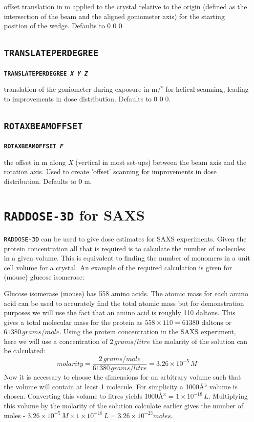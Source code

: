 \documentclass[a4paper]{article}
\newcommand{\RD}{\texttt{RADDOSE-3D}\xspace}
\newcommand{\Keyword}[1]{\texttt{\textbf{#1}}\xspace}
\begin{document}
offset translation in \hbox{\textmu}m applied to the crystal relative to the origin (defined as the intersection of the beam and the aligned goniometer axis) for the starting position of the wedge. Defaults to 0 0 0.



\subsection{\Keyword{TRANSLATEPERDEGREE}}

\noindent \Keyword{TRANSLATEPERDEGREE \textit{X Y Z}}

translation of the goniometer during exposure in \hbox{\textmu}m$/^{\circ}$ for helical scanning, leading to improvements in dose distribution. Defaults to 0 0 0.



\subsection{\Keyword{ROTAXBEAMOFFSET}}

\noindent \Keyword{ROTAXBEAMOFFSET \textit{F}}

the offset in \hbox{\textmu}m along \textit{X} (vertical in most set-ups) between the beam axis and the rotation axis. Used to create 'offset' scanning for improvements in dose distribution. Defaults to 0 \hbox{\textmu}m.

\newpage

\section{\RD for SAXS}

\RD can be used to give dose estimates for SAXS experiments. Given the protein concentration all that is required is to calculate the number of molecules in a given volume. This is equivalent to finding the number of monomers in a unit cell volume for a crystal. An example of the required calculation is given for (mouse) glucose isomerase:

Glucose isomerase (mouse) has 558 amino acids. The atomic mass for each amino acid can be used to accurately find the total atomic mass but for demonstration purposes we will use the fact that an amino acid is roughly 110 daltons. This gives a total molecular mass for the protein as $558 \times 110 = 61380$ daltons or $61380\,grams/mole$. Using the protein concentration in the SAXS experiment, here we will use a concentration of $2\,grams/litre$ the molarity of the solution can be calculated: 
\begin{equation}
molarity = \frac{2\,grams/mole}{61380\,grams/litre} = 3.26 \times 10^{-5}\,M
\end{equation} 
Now it is necessary to choose the dimensions for an arbitrary volume such that the volume will contain at least 1 molecule.
For simplicity a 1000\AA$^3$ volume is chosen. Converting this volume to litres yields 1000\AA$^3$ = $1 \times 10^{-18}\,L$. Multiplying this volume by the molarity of the solution calculate earlier gives the number of moles - $3.26 \times 10^{-5}\,M \times 1 \times 10^{-18}\,L = 3.26 \times 10^{-23} moles$.
\end{document}
